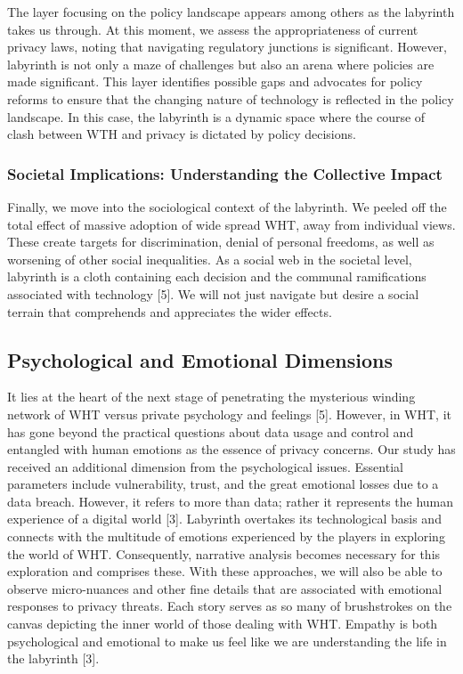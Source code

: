 \documentclass[11pt]{article}
\begin{document}
The layer focusing on the policy landscape appears among others as the labyrinth takes us through. At this moment, we assess the appropriateness of current privacy laws, noting that navigating regulatory junctions is significant. However, labyrinth is not only a maze of challenges but also an arena where policies are made significant. This layer identifies possible gaps and advocates for policy reforms to ensure that the changing nature of technology is reflected in the policy landscape. In this case, the labyrinth is a dynamic space where the course of clash between WTH and privacy is dictated by policy decisions.

\subsubsection{Societal Implications: Understanding the Collective Impact}

Finally, we move into the sociological context of the labyrinth. We peeled off the total effect of massive adoption of wide spread WHT, away from individual views. These create targets for discrimination, denial of personal freedoms, as well as worsening of other social inequalities. As a social web in the societal level, labyrinth is a cloth containing each decision and the communal ramifications associated with technology [5]. We will not just navigate but desire a social terrain that comprehends and appreciates the wider effects.

\subsection{Psychological and Emotional Dimensions}

It lies at the heart of the next stage of penetrating the mysterious winding network of WHT versus private psychology and feelings [5]. However, in WHT, it has gone beyond the practical questions about data usage and control and entangled with human emotions as the essence of privacy concerns. Our study has received an additional dimension from the psychological issues. Essential parameters include vulnerability, trust, and the great emotional losses due to a data breach. However, it refers to more than data; rather it represents the human experience of a digital world [3]. Labyrinth overtakes its technological basis and connects with the multitude of emotions experienced by the players in exploring the world of WHT. Consequently, narrative analysis becomes necessary for this exploration and comprises these. With these approaches, we will also be able to observe micro-nuances and other fine details that are associated with emotional responses to privacy threats. Each story serves as so many of brushstrokes on the canvas depicting the inner world of those dealing with WHT. Empathy is both psychological and emotional to make us feel like we are understanding the life in the labyrinth [3].
\end{document}
